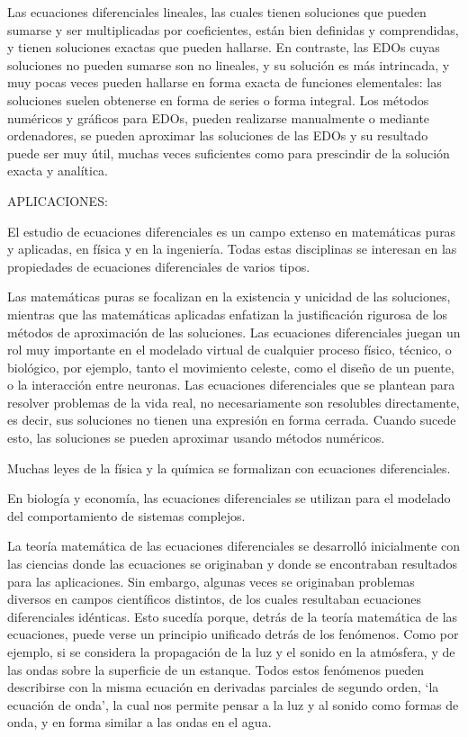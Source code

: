 Las ecuaciones diferenciales lineales, las cuales tienen soluciones que pueden sumarse y ser multiplicadas por coeficientes, están bien definidas y comprendidas, y tienen soluciones exactas que pueden hallarse. En contraste, las EDOs cuyas soluciones no pueden sumarse son no lineales, y su solución es más intrincada, y muy pocas veces pueden hallarse en forma exacta de funciones elementales: las soluciones suelen obtenerse en forma de series o forma integral. Los métodos numéricos y gráficos para EDOs, pueden realizarse manualmente o mediante ordenadores, se pueden aproximar las soluciones de las EDOs y su resultado puede ser muy útil, muchas veces suficientes como para prescindir de la solución exacta y analítica.


\vspace{4mm}

APLICACIONES:

\vspace{3mm}

El estudio de ecuaciones diferenciales es un campo extenso en matemáticas puras y aplicadas, en física y en la ingeniería. Todas estas disciplinas se interesan en las propiedades de ecuaciones diferenciales de varios tipos. 

Las matemáticas puras se focalizan en la existencia y unicidad de las soluciones, mientras que las matemáticas aplicadas enfatizan la justificación rigurosa de los métodos de aproximación de las soluciones. Las ecuaciones diferenciales juegan un rol muy importante en el modelado virtual de cualquier proceso físico, técnico, o biológico, por ejemplo, tanto el movimiento celeste, como el diseño de un puente, o la interacción entre neuronas. Las ecuaciones diferenciales que se plantean para resolver problemas de la vida real, no necesariamente son resolubles directamente, es decir, sus soluciones no tienen una expresión en forma cerrada. Cuando sucede esto, las soluciones se pueden aproximar usando métodos numéricos.

Muchas leyes de la física y la química se formalizan con ecuaciones diferenciales. 

En biología y economía, las ecuaciones diferenciales se utilizan para el modelado del comportamiento de sistemas complejos. 

La teoría matemática de las ecuaciones diferenciales se desarrolló inicialmente con las ciencias donde las ecuaciones se originaban y donde se encontraban resultados para las aplicaciones. Sin embargo, algunas veces se originaban problemas diversos en campos científicos distintos, de los cuales resultaban ecuaciones diferenciales idénticas. Esto sucedía porque, detrás de la teoría matemática de las ecuaciones, puede verse un principio unificado detrás de los fenómenos. Como por ejemplo, si se considera la propagación de la luz y el sonido en la atmósfera, y de las ondas sobre la superficie de un estanque. Todos estos fenómenos pueden describirse con la misma ecuación en derivadas parciales de segundo orden, `la ecuación de onda', la cual nos permite pensar a la luz y al sonido como formas de onda, y en forma similar a las ondas en el agua. 

